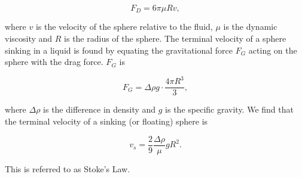 \begin{equation}
F_D = 6\pi \mu R v,
\end{equation}

where $v$ is the velocity of the sphere relative to the fluid, $\mu$ is the dynamic viscosity and $R$ is the radius of the sphere. The terminal velocity of a sphere sinking in a liquid is found by equating the gravitational force $F_G$ acting on the sphere with the drag force. $F_G$ is

\begin{equation}
F_G = \Delta \rho g\cdot \frac{4\pi R^3}{3},
\end{equation}

where $\Delta \rho$ is the difference in density and $g$ is the specific gravity. We find that the terminal velocity of a sinking (or floating) sphere is

\begin{equation}\label{eq:fallingSphere}
v_s = \frac{2}{9} \frac{\Delta \rho}{\mu} g R^2.
\end{equation}

This is referred to as Stoke's Law. %
%
